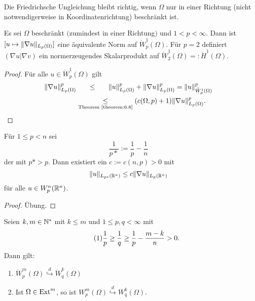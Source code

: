 \begin{bem}
  \label{bem:6.9} Die Friedrichsche Ungleichung bleibt richtig, wenn $\Omega$ nur in einer Richtung (nicht notwendigerweise in Koordinatenrichtung) beschränkt ist.
\end{bem}

\begin{kor}
  \label{kor:6.10} Es sei $\Omega$ beschränkt $($zumindest in einer Richtung$)$ und $1<p<\infty$. Dann ist $[u\mapsto\lVert \nabla u\rVert_{L_p(\Omega)}]$ eine äquivalente Norm auf $\mathring{W}_p^1(\Omega)$. Für $p=2$ definiert $(\nabla u\vert\nabla v)$ ein normerzeugendes Skalarprodukt auf $\mathring W_2^1(\Omega)=:\mathring H^1(\Omega)$.
\end{kor}

\begin{proof}
  Für alle $u\in\mathring W_p^1(\Omega)$ gilt
  \[
  \begin{split}
    \lVert \nabla u\rVert_{L_p(\Omega)}^p&\ \ \quad\leq \ \ \quad\lVert u\rVert^p_{L_p(\Omega)}+\lVert \nabla u\rVert^p_{L_p(\Omega)}=\lVert u\rVert^p_{\mathring W_p^1(\Omega)} \\
    &\underset{\text{\scriptsize Theorem~\ref{theorem:6.8}}}\leq(c(\Omega,p)+1)\lVert \nabla u\rVert^p_{L_p(\Omega)}. \qedhere
  \end{split}
  \]
\end{proof}

\begin{lemma}
  \label{lemma:6.11} Für $1\leq p<n$ sei
  \[ \frac 1{p\ast}:=\frac 1p-\frac 1n \]
  der  mit $p\ast>p$. Dann existiert ein $c:=c(n,p)>0$ mit
  \[ \lVert u\rVert_{L_{p\ast}(\mathbb{R}^n)}\leq c\lVert \nabla u\rVert_{L_p(\mathbb{R}^n)} \]
  für alle $u\in W_p^n(\mathbb{R}^n)$.
\end{lemma}

\begin{proof}
  Übung.
\end{proof}

\begin{theorem}
  \label{theorem:6.12} Seien $k,m\in\mathbb{N}^\ast$ mit $k \leq m$ und $  1\leq p,q<\infty$ mit
  \[
  \eq{eq:6.star}\frac 1p\geq\frac 1q\geq\frac 1p-\frac{m-k}n>0.
  \]
  Dann gilt:
  \begin{enumerate}[\rm(a)]
  \item \label{theorem:6.12-1} $\mathring W_p^m(\Omega)\overset d\hookrightarrow\mathring W_q^k(\Omega)$
  \item \label{theorem:6.12-2} Ist $\Omega\in\text{Ext}^m$, so ist $W_p^m(\Omega)\overset d\hookrightarrow W_q^k(\Omega)$.
  \end{enumerate}
\end{theorem}

